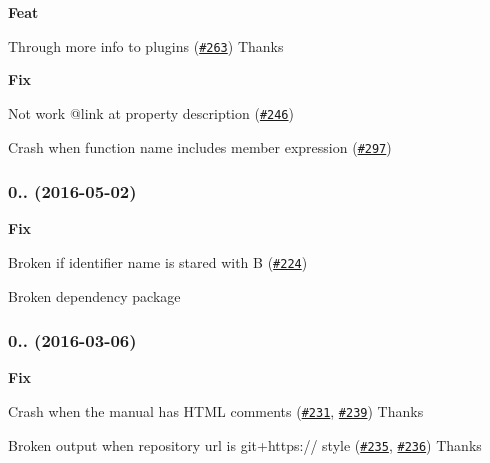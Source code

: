 \begin{DoxyItemize}
\item {\bfseries Feat}
\begin{DoxyItemize}
\item Through more info to plugins (\href{https://github.com/esdoc/esdoc/pull/263}{\tt \#263}) Thanks \href{https://github.com/typhonrt}{\tt }
\end{DoxyItemize}
\item {\bfseries Fix}
\begin{DoxyItemize}
\item Not work {\ttfamily @link} at property description (\href{https://github.com/esdoc/esdoc/issues/246}{\tt \#246})
\item Crash when function name includes member expression (\href{https://github.com/esdoc/esdoc/issues/297}{\tt \#297})
\end{DoxyItemize}
\end{DoxyItemize}

\subsubsection*{0.. (2016-\/05-\/02)}


\begin{DoxyItemize}
\item {\bfseries Fix}
\begin{DoxyItemize}
\item Broken if identifier name is stared with {\ttfamily B} (\href{https://github.com/esdoc/esdoc/issues/224}{\tt \#224})
\item Broken dependency package
\end{DoxyItemize}
\end{DoxyItemize}

\subsubsection*{0.. (2016-\/03-\/06)}


\begin{DoxyItemize}
\item {\bfseries Fix}
\begin{DoxyItemize}
\item Crash when the manual has H\+T\+ML comments (\href{https://github.com/esdoc/esdoc/issues/231}{\tt \#231}, \href{https://github.com/esdoc/esdoc/pull/239}{\tt \#239}) Thanks \href{https://github.com/staltz}{\tt }
\item Broken output when repository url is {\ttfamily git+https\+://} style (\href{https://github.com/esdoc/esdoc/issues/235}{\tt \#235}, \href{https://github.com/esdoc/esdoc/pull/236}{\tt \#236}) Thanks \href{https://github.com/jamsyoung}{\tt }
\end{DoxyItemize}
\end{DoxyItemize}


